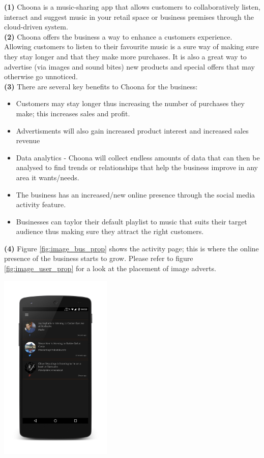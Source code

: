 \textbf{(1)} Choona is a music-sharing app that allows customers to collaboratively listen, interact and suggest music in your retail space or business premises through the cloud-driven system.  \\

\textbf{(2)} Choona offers the business a way to enhance a customers experience.  Allowing customers to listen to their favourite music is a sure way of making sure they stay longer and that they make more purchases.  It is also a great way to advertise (via images and sound bites) new products and special offers that may otherwise go unnoticed.  \\

\textbf{(3)} There are several key benefits to Choona for the business:
\begin{itemize}
\item Customers may stay longer thus increasing the number of purchases they make; this increases sales and profit.
\item Advertisments will also gain increased product interest and increased sales revenue
\item Data analytics - Choona will collect endless amounts of data that can then be analysed to find trends or relationships that help the business improve in any area it wants/needs.  
\item The business has an increased/new online presence through the social media activity feature. 
\item Businesses can taylor their default playlist to music that suits their target audience thus making sure they attract the right customers.
\end{itemize} 

\textbf{(4)} Figure \ref{fig:image_bus_prop} shows the activity page; this is where the online presence of the business starts to grow.  Please refer to figure \ref{fig:image_user_prop} for a look at the placement of image adverts.\\
\begin{minipage}{\linewidth}
\centering
\includegraphics[width=0.4\textwidth]{./img/idea_bus_prop.png}
\label{fig:image_bus_prop}
\end{minipage}\\

